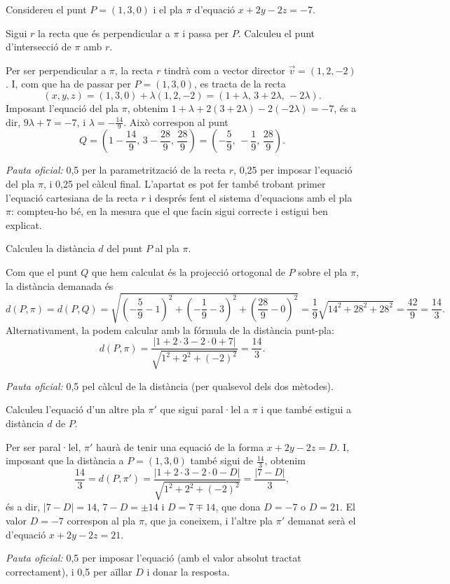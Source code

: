 Considereu el punt $P=(1,3,0)$ i el pla $\pi$ d'equació $x+2y-2z=-7$.

\begin{apartats}

Sigui $r$ la recta que és perpendicular a $\pi$ i passa per $P$. Calculeu el punt d'intersecció de $\pi$ amb $r$.

\begin{solucio}
Per ser perpendicular a $\pi$, la recta $r$ tindrà com a vector director $\vec v=(1,2,-2)$. I, com que ha de
passar per $P=(1,3,0)$, es tracta de la recta
\[
(x,y,z)=(1,3,0)+\lambda(1,2,-2)=(1+\lambda,\,3+2\lambda,\,-2\lambda).
\]
Imposant l'equació del pla $\pi$, obtenim $1+\lambda+2(3+2\lambda)-2(-2\lambda)=-7$, és a dir, $9\lambda+7=-7$,
i $\lambda=-\frac{14}{9}$. Això correspon al punt
\[
Q=\left(1-\frac{14}{9},\,3-\frac{28}{9},\,\frac{28}{9}\right)=\left(-\frac59,\,-\frac19,\,\frac{28}{9}\right).
\]

\textit{Pauta oficial:} 0,5 per la parametrització de la recta $r$, 0,25 per imposar l'equació del pla $\pi$, i
0,25 pel càlcul final. L'apartat es pot fer també trobant primer l'equació cartesiana de la recta $r$ i després
fent el sistema d'equacions amb el pla $\pi$: compteu-ho bé, en la mesura que el que facin sigui correcte i
estigui ben explicat.
\end{solucio}

Calculeu la distància $d$ del punt $P$ al pla $\pi$.

\begin{solucio}
Com que el punt $Q$ que hem calculat és la projecció ortogonal de $P$ sobre el pla $\pi$, la distància
demanada és
\[
d(P,\pi)=d(P,Q)=\sqrt{\left(-\frac59-1\right)^2+\left(-\frac19-3\right)^2+\left(\frac{28}{9}-0\right)^2}
=\frac19\sqrt{14^2+28^2+28^2}=\frac{42}{9}=\frac{14}{3}.
\]
Alternativament, la podem calcular amb la fórmula de la distància punt-pla:
\[
d(P,\pi)=\frac{|1+2\cdot3-2\cdot0+7|}{\sqrt{1^2+2^2+(-2)^2}}=\frac{14}{3}.
\]

\textit{Pauta oficial:} 0,5 pel càlcul de la distància (per qualsevol dels dos mètodes).
\end{solucio}

Calculeu l'equació d'un altre pla $\pi'$ que sigui paral·lel a $\pi$ i que també estigui a distància $d$ de $P$.

\begin{solucio}
Per ser paral·lel, $\pi'$ haurà de tenir una equació de la forma $x+2y-2z=D$. I, imposant que la distància a
$P=(1,3,0)$ també sigui de $\frac{14}{3}$, obtenim
\[
\frac{14}{3}=d(P,\pi')=\frac{|1+2\cdot3-2\cdot0-D|}{\sqrt{1^2+2^2+(-2)^2}}=\frac{|7-D|}{3},
\]
és a dir, $|7-D|=14$, $7-D=\pm14$ i $D=7\mp14$, que dona $D=-7$ o $D=21$. El valor $D=-7$ correspon al pla
$\pi$, que ja coneixem, i l'altre pla $\pi'$ demanat serà el d'equació $x+2y-2z=21$.

\textit{Pauta oficial:} 0,5 per imposar l'equació (amb el valor absolut tractat correctament), i 0,5 per aïllar
$D$ i donar la resposta.
\end{solucio}

\end{apartats}
